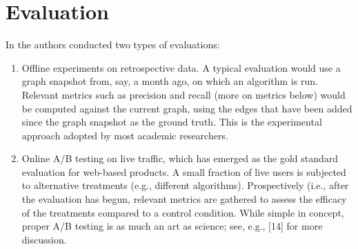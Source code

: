 \chapter{Evaluation}
\label{evaluation}
In \cite{gupta2013wtf} the authors conducted two types of evaluations:

\begin{enumerate}
	\item Offline experiments on retrospective data. A typical evaluation would use a graph snapshot from, say, a month ago, on which an algorithm is run. Relevant metrics such as precision and recall (more on metrics below) would be computed against the current graph, using the edges that have been added since the graph snapshot as the ground truth. This is the experimental approach adopted by most academic researchers.
	\item Online A/B testing on live traffic, which has emerged as the gold standard evaluation for web-based products. A small fraction of live users is subjected to alternative treatments (e.g., different algorithms). Prospectively (i.e., after the evaluation has begun, relevant metrics are gathered to assess the efficacy of the treatments compared to a control condition. While simple in concept, proper A/B testing is as much an art as science; see, e.g., [14] for more discussion.
\end{enumerate}
